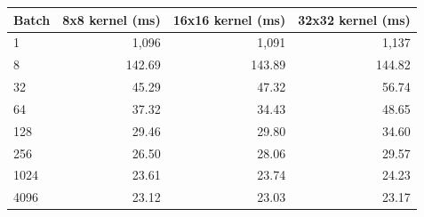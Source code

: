 \begin{tabular}{lrrr}
\toprule
Batch & 8x8 kernel (ms) & 16x16 kernel (ms) & 32x32 kernel (ms) \\
\midrule
1 & 1,096 & 1,091 & 1,137 \\
8 & 142.69 & 143.89 & 144.82 \\
32 & 45.29 & 47.32 & 56.74 \\
64 & 37.32 & 34.43 & 48.65 \\
128 & 29.46 & 29.80 & 34.60 \\
256 & 26.50 & 28.06 & 29.57 \\
1024 & 23.61 & 23.74 & 24.23 \\
4096 & 23.12 & 23.03 & 23.17 \\
\bottomrule
\end{tabular}
